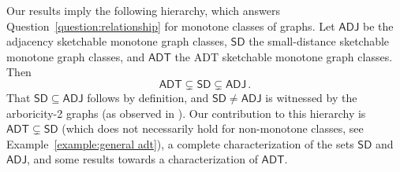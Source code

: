 \documentclass[11pt]{article}
\theoremstyle{definition}
\begin{document}
\noindent
Our results imply the following hierarchy, which answers Question~\ref{question:relationship} for
monotone classes of graphs.  Let $\mathsf{ADJ}$ be the adjacency sketchable monotone graph classes,
$\mathsf{SD}$ the small-distance sketchable monotone graph classes, and $\mathsf{ADT}$ the ADT
sketchable monotone graph classes. Then
\[
\mathsf{ADT} \subsetneq \mathsf{SD} \subsetneq \mathsf{ADJ} \,.
\]
\noindent
That $\mathsf{SD} \subseteq \mathsf{ADJ}$ follows by definition, and $\mathsf{SD} \neq \mathsf{ADJ}$
is witnessed by the arboricity-2 graphs (as observed in \cite{Har20}). Our contribution to this
hierarchy is $\mathsf{ADT} \subsetneq \mathsf{SD}$ (which does not necessarily hold for non-monotone
classes, see Example~\ref{example:general adt}), a complete characterization of the sets
$\mathsf{SD}$ and $\mathsf{ADJ}$, and some results towards a characterization of $\mathsf{ADT}$.

\end{document}

